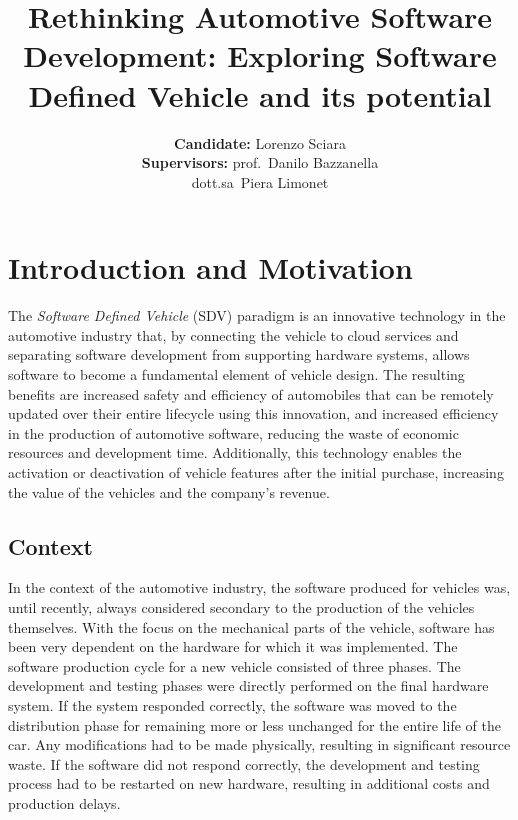 \documentclass[10pt,a4paper,roman, twocolumn]{article}
\title{\LARGE\textbf{Rethinking Automotive Software Development: Exploring Software Defined Vehicle and its potential}}
\author{
	\textbf{Candidate:} Lorenzo Sciara\\
	\textbf{Supervisors:} prof.~Danilo Bazzanella \\ dott.sa~Piera Limonet
}
\date{}
\begin{document}
\setlength{\belowdisplayskip}{0pt} \setlength{\belowdisplayshortskip}{0pt}
\setlength{\abovedisplayskip}{-0.5\baselineskip} \setlength{\abovedisplayshortskip}{-0.5\baselineskip}

	
\maketitle
		
\section{Introduction and Motivation}
The \textit{Software Defined Vehicle} (SDV) paradigm is an innovative technology in the automotive industry that, by connecting the vehicle to cloud services and separating software development from supporting hardware systems, allows software to become a fundamental element of vehicle design. The resulting benefits are increased safety and efficiency of automobiles that can be remotely updated over their entire lifecycle using this innovation, and increased efficiency in the production of automotive software, reducing the waste of economic resources and development time. Additionally, this technology enables the activation or deactivation of vehicle features after the initial purchase, increasing the value of the vehicles and the company's revenue.

\subsection{Context}
In the context of the automotive industry, the software produced for vehicles was, until recently, always considered secondary to the production of the vehicles themselves. With the focus on the mechanical parts of the vehicle, software has been very dependent on the hardware for which it was implemented. The software production cycle for a new vehicle consisted of three phases. The development and testing phases were directly performed on the final hardware system. If the system responded correctly, the software was moved to the distribution phase for remaining more or less unchanged for the entire life of the car. Any modifications had to be made physically, resulting in significant resource waste. If the software did not respond correctly, the development and testing process had to be restarted on new hardware, resulting in additional costs and production delays.
\end{document}
